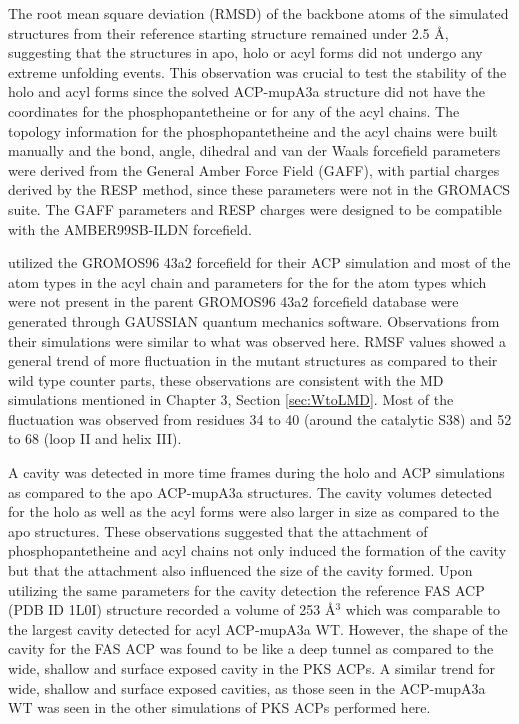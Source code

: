 The root mean square deviation (RMSD) of the backbone atoms of the simulated structures from their reference starting structure remained under 2.5 \AA, suggesting that the structures in apo, holo or acyl forms did not undergo any extreme unfolding events. This observation was crucial to test the stability of the holo and acyl forms since the solved ACP-mupA3a structure did not have the coordinates for the phosphopantetheine or for any of the acyl chains. The topology information for the phosphopantetheine and the acyl chains were built manually and the bond, angle, dihedral and van der Waals forcefield parameters were derived from the General Amber Force Field (GAFF), with partial charges  derived by the RESP method, since these parameters were not in the GROMACS suite. The GAFF parameters and RESP charges were designed to be compatible with the AMBER99SB-ILDN forcefield.

\textcite{Chan2008} utilized the GROMOS96 43a2 forcefield for their ACP simulation and most of the atom types in the acyl chain and parameters for the for the atom types which were not present in the parent GROMOS96 43a2 forcefield database were generated through GAUSSIAN quantum mechanics software. Observations from their simulations were similar to what was observed here. RMSF values showed a general trend of more fluctuation in the mutant structures as compared to their wild type counter parts, these observations are consistent with the MD simulations mentioned in Chapter 3, Section \ref{sec:WtoLMD}. Most of the fluctuation was observed from residues 34 to 40 (around the catalytic S38) and 52 to 68 (loop II and helix III).

A cavity was detected in more time frames during the holo and ACP simulations as compared to the apo ACP-mupA3a structures. The cavity volumes detected for the holo as well as the acyl forms were also larger in size as compared to the apo structures. These observations suggested that the attachment of phosphopantetheine and acyl chains not only induced the formation of the cavity but that the attachment also influenced the size of the cavity formed. Upon utilizing the same parameters for the cavity detection the reference FAS ACP (PDB ID 1L0I) structure recorded a volume of 253 \AA$ ^{3} $ which was comparable to the largest cavity detected for acyl ACP-mupA3a WT. However, the shape of the cavity for the FAS ACP was found to be like a deep tunnel as compared to the wide, shallow and surface exposed cavity in the PKS ACPs. A similar trend for wide, shallow and surface exposed cavities, as those seen in the ACP-mupA3a WT was seen in the other simulations of PKS ACPs performed here. 

